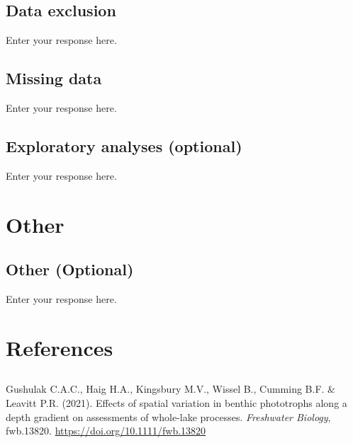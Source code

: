 \documentclass[]{article}
\begin{document}
\hypertarget{data-exclusion}{%
\subsection{Data exclusion}\label{data-exclusion}}

Enter your response here.

\hypertarget{missing-data}{%
\subsection{Missing data}\label{missing-data}}

Enter your response here.

\hypertarget{exploratory-analyses-optional}{%
\subsection{Exploratory analyses
(optional)}\label{exploratory-analyses-optional}}

Enter your response here.

\hypertarget{other}{%
\section{Other}\label{other}}

\hypertarget{other-optional}{%
\subsection{Other (Optional)}\label{other-optional}}

Enter your response here.

\hypertarget{references}{%
\section{References}\label{references}}

\hypertarget{section}{%
\subsection{}\label{section}}

\vspace{-2pc}
\setlength{\parindent}{-0.5in}
\setlength{\leftskip}{-1in}
\setlength{\parskip}{8pt}

\noindent

\hypertarget{refs}{}
\begin{CSLReferences}{1}{0}
\leavevmode\hypertarget{ref-gushulak_effects_2021}{}%
Gushulak C.A.C., Haig H.A., Kingsbury M.V., Wissel B., Cumming B.F. \&
Leavitt P.R. (2021). Effects of spatial variation in benthic phototrophs
along a depth gradient on assessments of whole‐lake processes.
\emph{Freshwater Biology}, fwb.13820.
\url{https://doi.org/10.1111/fwb.13820}

\end{CSLReferences}
\end{document}
